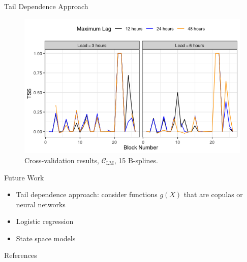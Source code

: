 \documentclass{beamer}
\begin{document}
\begin{frame}{Tail Dependence Approach}
    \begin{figure}
        \centering
        \includegraphics[scale=0.5]{group05_cv_study01_tss.png}
        \caption{Cross-validation results, $\mathcal{C}_{\text{LM}}$, 15 B-splines.}
        \label{fig:group05_cv_study01_tss}
    \end{figure}
\end{frame}

\begin{frame}{Future Work}
    \begin{itemize}
        \item Tail dependence approach: consider functions $g(X)$ that are copulas or neural networks
        \item Logistic regression
        \item State space models
    \end{itemize}
\end{frame}

\begin{frame}{References}
    \nocite{*}
    \printbibliography
\end{frame}
\end{document}
